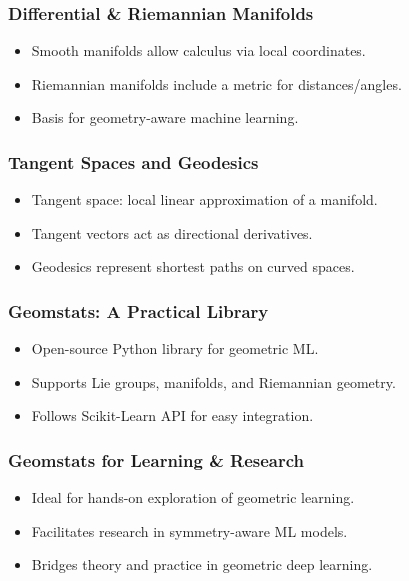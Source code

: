 \begin{frame}[fragile]\frametitle{Differential \& Riemannian Manifolds}
  \begin{itemize}
    \item Smooth manifolds allow calculus via local coordinates.
    \item Riemannian manifolds include a metric for distances/angles.
    \item Basis for geometry-aware machine learning.
  \end{itemize}
\end{frame}

\begin{frame}[fragile]\frametitle{Tangent Spaces and Geodesics}
  \begin{itemize}
    \item Tangent space: local linear approximation of a manifold.
    \item Tangent vectors act as directional derivatives.
    \item Geodesics represent shortest paths on curved spaces.
  \end{itemize}
\end{frame}

\begin{frame}[fragile]\frametitle{Geomstats: A Practical Library}
  \begin{itemize}
    \item Open-source Python library for geometric ML.
    \item Supports Lie groups, manifolds, and Riemannian geometry.
    \item Follows Scikit-Learn API for easy integration.
  \end{itemize}
\end{frame}

\begin{frame}[fragile]\frametitle{Geomstats for Learning \& Research}
  \begin{itemize}
    \item Ideal for hands-on exploration of geometric learning.
    \item Facilitates research in symmetry-aware ML models.
    \item Bridges theory and practice in geometric deep learning.
  \end{itemize}
\end{frame}

